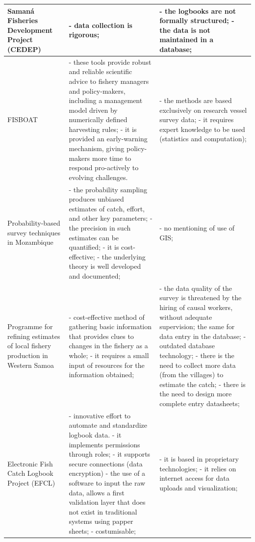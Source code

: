 \documentclass[11pt]{article} %
\begin{document}
\begin{center}
\begin{supertabular}{ | p{0.3\textwidth} | p{0.3\textwidth} | p{0.3\textwidth} |}
Samaná Fisheries Development Project (CEDEP) & - data collection is rigorous; & - the logbooks are not formally structured; - the data is not maintained in a database; \\ \hline
FISBOAT & - these tools provide robust and reliable scientific advice to fishery managers and policy-makers, including a management model driven by numerically defined harvesting rules; - it is provided an early-warning mechanism, giving policy-makers more time to respond pro-actively to evolving challenges. & - the methods are based exclusively on research vessel survey data; - it requires expert knowledge to be used (statistics and computation); \\ \hline
Probability-based survey techniques in Mozambique & - the probability sampling produces unbiased estimates of catch, effort, and other key parameters; - the precision in such estimates can be quantified; - it is cost-effective; - the underlying theory is well developed and documented; & - no mentioning of use of GIS; \\ \hline
Programme for refining estimates of local fishery production in Western Samoa & - cost-effective method of gathering basic information that provides clues to changes in the fishery as a whole; - it requires a small input of resources for the information obtained; & - the data quality of the survey is threatened by the hiring of causal workers, without adequate supervision; the same for data entry in the database; - outdated database technology; - there is the need to collect more data (from the villages) to estimate the catch; - there is the need to design more complete entry datasheets; \\ \hline
Electronic Fish Catch Logbook Project (EFCL) & - innovative effort to automate and standardize logbook data. - it implements permissions through roles; - it supports secure connections (data encryption) - the use of a software to input the raw data, allows a first validation layer that does not exist in traditional systems using papper sheets; - costumisable;  & - it is based in proprietary technologies; - it relies on internet access for data uploads and visualization; \\ \hline
\end{supertabular}
\end{center}
\end{document}
